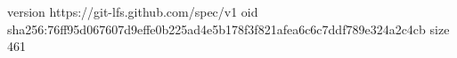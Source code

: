 version https://git-lfs.github.com/spec/v1
oid sha256:76ff95d067607d9effe0b225ad4e5b178f3f821afea6c6c7ddf789e324a2c4cb
size 461
